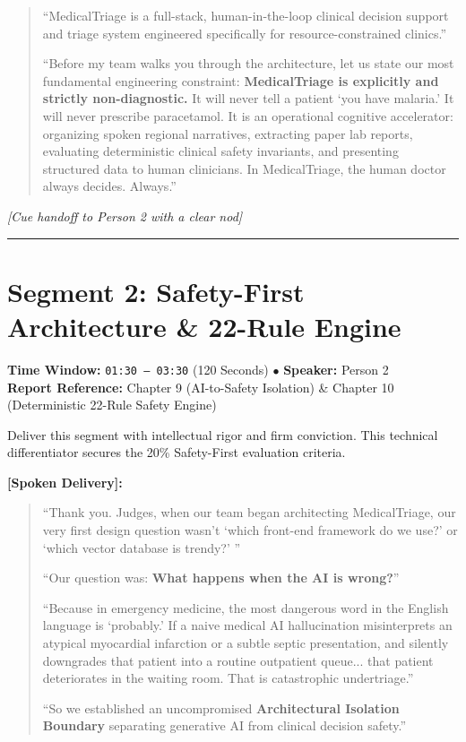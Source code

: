 \documentclass[11pt,a4paper]{article}
\begin{document}
\begin{quote}
``MedicalTriage is a full-stack, human-in-the-loop clinical decision support and triage system engineered specifically for resource-constrained clinics.''

``Before my team walks you through the architecture, let us state our most fundamental engineering constraint: \textbf{MedicalTriage is explicitly and strictly non-diagnostic.} It will never tell a patient `you have malaria.' It will never prescribe paracetamol. It is an operational cognitive accelerator: organizing spoken regional narratives, extracting paper lab reports, evaluating deterministic clinical safety invariants, and presenting structured data to human clinicians. In MedicalTriage, the human doctor always decides. Always.''
\end{quote}

\noindent \textit{[Cue handoff to Person 2 with a clear nod]}

\vspace{4mm}
\hrule
\vspace{6mm}

\section{Segment 2: Safety-First Architecture \& 22-Rule Engine}
\noindent \textbf{Time Window:} \texttt{01:30 -- 03:30} (120 Seconds) \quad $\bullet$ \quad \textbf{Speaker:} Person 2\\
\textbf{Report Reference:} Chapter 9 (AI-to-Safety Isolation) \& Chapter 10 (Deterministic 22-Rule Safety Engine)

\begin{stagenote}
Deliver this segment with intellectual rigor and firm conviction. This technical differentiator secures the 20\% Safety-First evaluation criteria.
\end{stagenote}

\vspace{1mm}
\noindent \textbf{[Spoken Delivery]:}
\begin{quote}
``Thank you. Judges, when our team began architecting MedicalTriage, our very first design question wasn't `which front-end framework do we use?' or `which vector database is trendy?' ''

``Our question was: \textbf{What happens when the AI is wrong?}''

``Because in emergency medicine, the most dangerous word in the English language is `probably.' If a naive medical AI hallucination misinterprets an atypical myocardial infarction or a subtle septic presentation, and silently downgrades that patient into a routine outpatient queue... that patient deteriorates in the waiting room. That is catastrophic undertriage.''

``So we established an uncompromised \textbf{Architectural Isolation Boundary} separating generative AI from clinical decision safety.''
\end{quote}
\end{document}
